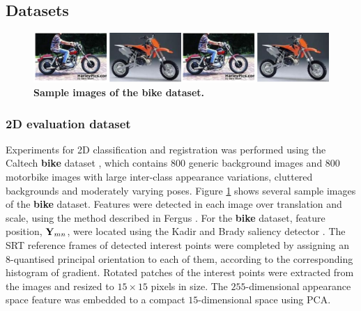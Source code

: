 \subsection{Datasets}

\begin{figure}[t]
	\centering
	\includegraphics[width=1\linewidth]{./fig/reg/bike_long.png}
	\caption{\textbf{Sample images of the \textbf{bike} dataset.}}
	\label{fig/reg/bike}
\end{figure}

\subsubsection{2D evaluation dataset}
Experiments for 2D classification and registration was performed using the Caltech \textbf{bike} dataset \cite{ComputationalVisionLab2001}, which contains 800 generic background images and 800 motorbike images with large inter-class appearance variations, cluttered backgrounds and moderately varying poses. Figure \ref{fig/reg/bike} shows several sample images of the \textbf{bike} dataset.  
Features were detected in each image over translation and scale, using the method described in Fergus \etal \cite{Fergus2007}. 
For the \textbf{bike} dataset, feature position, $\mathbf{Y}_{mn}$, were located using the Kadir and Brady saliency detector \cite{Kadir2001}. The SRT reference frames of detected interest points were completed by assigning an $8$-quantised principal orientation to each of them, according to the corresponding histogram of gradient. 
Rotated patches of the interest points were extracted from the images and resized to $15 \times 15$ pixels in size.
The $255$-dimensional appearance space feature was embedded to a compact $15$-dimensional space using PCA. 

